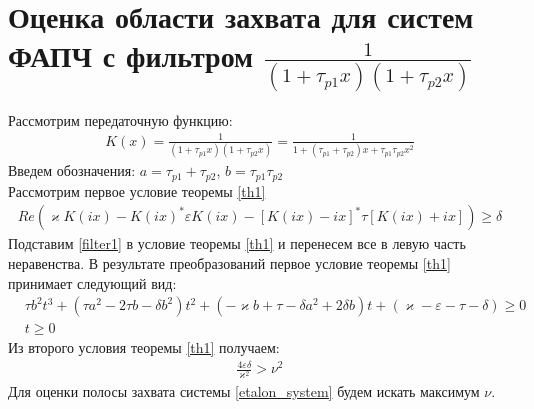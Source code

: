 \documentclass[a4paper,14pt]{extarticle} %
\begin{document}
\section{Оценка области захвата для систем ФАПЧ с фильтром $\frac{1}{(1+\tau_{p1}x)(1+\tau_{p2}x)}$}
 Рассмотрим передаточную функцию:
 \begin{equation}\label{filter1}
 \begin{aligned}
K(x) = \frac{1}{(1+\tau_{p1}x)(1+\tau_{p2}x)} = \frac{1}{1+(\tau_{p1}+\tau_{p2})x + \tau_{p1}\tau_{p2}x^2}
 \end{aligned}
\end{equation}
Введем обозначения: $a = \tau_{p1}+\tau_{p2}$, $b = \tau_{p1}\tau_{p2}$\\
Рассмотрим первое условие теоремы \ref{th1}
\begin{equation}
 \begin{aligned}
Re(\varkappa K(ix)-K(ix)^*\varepsilon K(ix)-[K(ix)-ix]^*\tau[K(ix)+ix])\geq\delta
 \end{aligned}
\end{equation}
Подставим \eqref{filter1} в условие теоремы \ref{th1} и перенесем все в левую часть неравенства. В результате преобразований первое условие теоремы \ref{th1} принимает следующий вид:
\begin{equation}\label{first_condition}
 \begin{aligned}
&\tau b^2t^3 + (\tau a^2-2 \tau b - \delta b^2)t^2 + (-\varkappa b+\tau-\delta a^2 + 2\delta b)t + (\varkappa-\varepsilon-\tau-\delta) \geq 0\\
&t \geq 0
 \end{aligned}
\end{equation}
Из второго условия теоремы \ref{th1} получаем: 
\begin{equation}
 \begin{aligned}
\frac{4\varepsilon\delta}{\varkappa^2} > \nu^2
 \end{aligned}
\end{equation}
Для оценки полосы захвата системы \eqref{etalon_system} будем искать максимум $\nu$.
\end{document}
